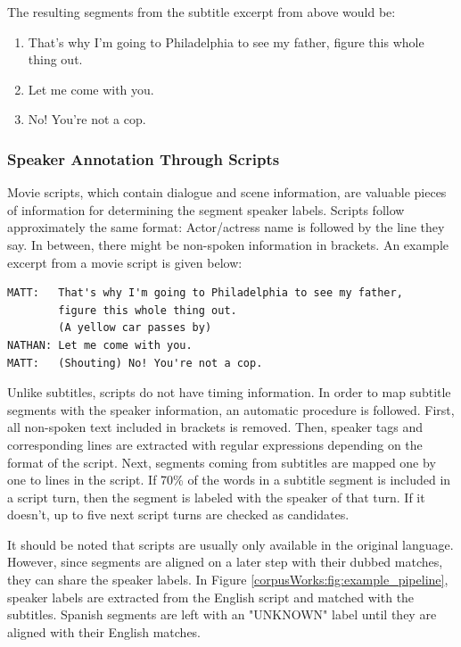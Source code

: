 The resulting segments from the subtitle excerpt from above would be:
\begin{enumerate}
    \item That's why I'm going to Philadelphia to see my father, figure this whole thing out.
    \item Let me come with you.
    \item No! You're not a cop.
\end{enumerate}

\subsubsection*{Speaker Annotation Through Scripts}
Movie scripts, which contain dialogue and scene information, are valuable pieces of information for determining the segment speaker labels. Scripts follow approximately the same format: Actor/actress name is followed by the line they say. In between, there might be non-spoken information in brackets. An example excerpt from a movie script is given below:

\begin{lstlisting}
MATT:   That's why I'm going to Philadelphia to see my father, 
        figure this whole thing out.
        (A yellow car passes by)
NATHAN: Let me come with you.
MATT:   (Shouting) No! You're not a cop.
\end{lstlisting}

Unlike subtitles, scripts do not have timing information. In order to map subtitle segments with the speaker information, an automatic procedure is followed. First, all non-spoken text included in brackets is removed. Then, speaker tags and corresponding lines are extracted with regular expressions depending on the format of the script. Next, segments coming from subtitles are mapped one by one to lines in the script. If 70\% of the words in a subtitle segment is included in a script turn, then the segment is labeled with the speaker of that turn. If it doesn't, up to five next script turns are checked as candidates. 

It should be noted that scripts are usually only available in the original language. However, since segments are aligned on a later step with their dubbed matches, they can share the speaker labels. In Figure \ref{corpusWorks:fig:example_pipeline}, speaker labels are extracted from the English script and matched with the subtitles. Spanish segments are left with an "UNKNOWN" label until they are aligned with their English matches. 

